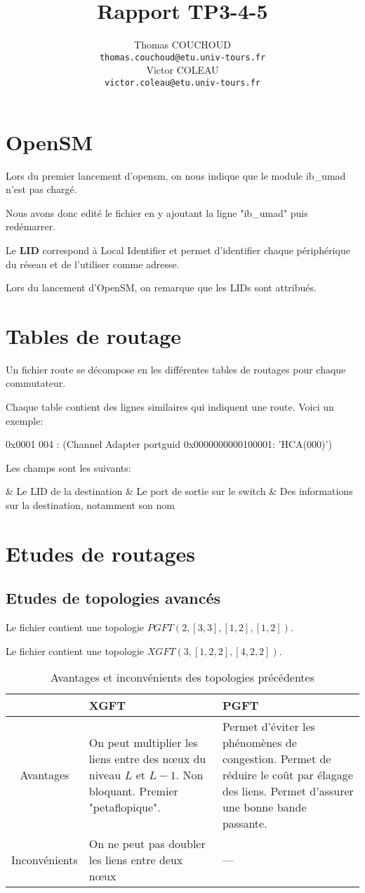 \documentclass{report}
\title{Rapport TP3-4-5}
\author{Thomas COUCHOUD\\\texttt{thomas.couchoud@etu.univ-tours.fr}\\Victor COLEAU\\\texttt{victor.coleau@etu.univ-tours.fr}}
\begin{document}
	\mccTitle[no]
	\tableofcontents

	\chapter{OpenSM}
		Lors du premier lancement d'opensm, on nous indique que le module ib\_umad n'est pas chargé.
		
		Nous avons donc edité le fichier  en y ajoutant la ligne "ib\_umad" puis redémarrer.
		
		Le \textbf{LID} correspond à Local Identifier et permet d'identifier chaque périphérique du réseau et de l'utiliser comme adresse.
		
		Lors du lancement d'OpenSM, on remarque que les LIDs sont attribués.
	
	\chapter{Tables de routage}
		Un fichier route se décompose en les différentes tables de routages pour chaque commutateur.
		
		Chaque table contient des lignes similaires qui indiquent une route. Voici un exemple:
		
		0x0001 004 : (Channel Adapter portguid 0x0000000000100001: 'HCA(000)')
		
		Les champs sont les suivants:
		\begin{easylist}
			& Le LID de la destination
			& Le port de sortie sur le switch
			& Des informations sur la destination, notamment son nom
		\end{easylist}

	
	\chapter{Etudes de routages}
		\section{Etudes de topologies avancés}
			Le fichier  contient une topologie $PGFT\left( 2,\left[ 3,3\right], \left[ 1,2\right], \left[ 1,2\right]\right)$.
			
			Le fichier  contient une topologie $XGFT\left( 3, \left[ 1,2,2\right], \left[ 4,2,2\right]\right)$.
			
			\begin{table}[H]%
				\begin{tabularx}{0.99\textwidth}{|c|X|X|}
					\hline
					& XGFT & PGFT\\\hline\endhead
					Avantages & On peut multiplier les liens entre des n\oe ux du niveau $L$ et $L-1$. Non bloquant. Premier "petaflopique".& Permet d'éviter les phénomènes de congestion. Permet de réduire le coût par élagage des liens. Permet d'assurer une bonne bande passante.\\\hline
					Inconvénients & On ne peut pas doubler les liens entre deux n\oe ux & ---\\\hline	
				\end{tabularx}
				\caption{Avantages et inconvénients des topologies précédentes}
			\end{table}
			
\end{document}
